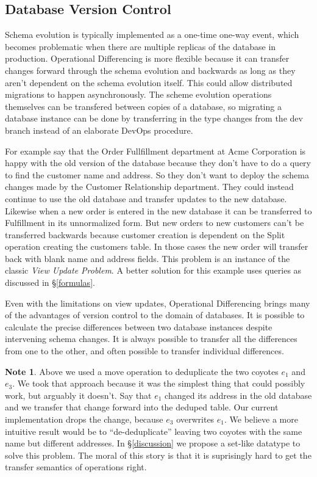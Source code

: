 \documentclass[english,submission]{programming}
\theoremstyle{definition}
\newtheorem*{note}{Note}
\begin{document}
\subsection{Database Version Control}\label{db-vc}

Schema evolution is typically implemented as a one-time one-way event, which becomes problematic when there are multiple replicas of the database in production. Operational Differencing is more flexible because it can transfer changes forward through the schema evolution and backwards as long as they aren't dependent on the schema evolution itself. This could allow distributed migrations to happen asynchronously.
The scheme evolution operations themselves can be transfered between copies of a database, so migrating a database instance can be done by transferring in the type changes from the dev branch instead of an elaborate DevOps procedure.

For example say that the Order Fullfillment department at Acme Corporation is happy with the old version of the database because they don't have to do a query to find the customer name and address. So they don't want to deploy the schema changes made by the Customer Relationship department. They could instead continue to use the old database and transfer updates to the new database. Likewise when a new order is entered in the new database it can be transferred to Fulfillment in its unnormalized form. But new orders to new customers can't be transferred backwards because customer creation is dependent on the \textsf{Split} operation creating the customers table. In those cases the new order will transfer back with blank name and address fields. This problem is an instance of the classic \textit{View Update Problem}\cite{Bancilhon81, Foster2007}. A better solution for this example uses queries as discussed in \S\ref{formulas}.

Even with the limitations on view updates, Operational Differencing brings many of the advantages of version control to the domain of databases. It is possible to calculate the precise differences between two database instances despite intervening schema changes. It is always possible to transfer all the differences from one to the other, and often possible to transfer individual differences.

\begin{note}
Above we used a \textsf{move} operation to deduplicate the two coyotes $e_1$ and $e_3$. We took that approach because it was the simplest thing that could possibly work, but arguably it doesn't. Say that $e_1$ changed its address in the old database and we transfer that change forward into the deduped table. Our current implementation drops the change, because $e_3$ overwrites $e_1$. We believe a more intuitive result would be to ``de-deduplicate''
leaving two coyotes with the same name but different addresses.
In \S\ref{discussion} we propose a set-like datatype to solve this problem.
The moral of this story is that it is suprisingly hard to get the transfer semantics of operations right.
\end{note}
\end{document}
